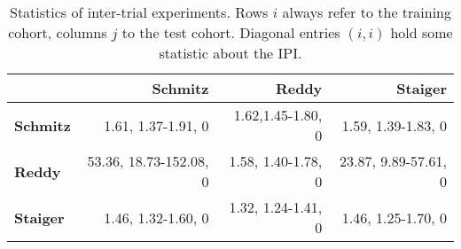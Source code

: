 \begin{table}
    \vspace{0.5cm}
    \begin{subtable}{\textwidth}
        \centering
        \begin{tabular}{lrrr}
            \hline
            & \textbf{Schmitz} & \textbf{Reddy} & \textbf{Staiger} \\
            \hline
            \textbf{Schmitz} & \num{1.61}, \num{1.37}-\num{1.91}, \num{0} & 
                \num{1.62},\num{1.45}-\num{1.80}, \num{0} & 
                \num{1.59}, \num{1.39}-\num{1.83}, 0 \\
            \textbf{Reddy} & \num{53.36}, \num{18.73}-\num{152.08}, 0 & 
                \num{1.58}, \num{1.40}-\num{1.78}, \num{0} & 
                \num{23.87}, \num{9.89}-\num{57.61}, 0 \\
            \textbf{Staiger} & \num{1.46}, \num{1.32}-\num{1.60}, 0 & 
                \num{1.32}, \num{1.24}-\num{1.41}, \num{0} & 
                \num{1.46}, \num{1.25}-\num{1.70}, \num{0} \\
            \hline
        \end{tabular}
        \caption{Hazard ratio, its \num{95}\%-confidence interval and p-value for the null 
            hypothesis of the hazard ratio being equal to one. Diagonal entries show these 
            properties for the $\text{tIPI}$, off-diagonal entries for the best model trained and 
            validated on cohort $i$, $m_i^*$. All p-values are below 
            \num[scientific-notation]{5e-6}.}
            \label{subtab:inter-hr}
    \end{subtable}
    \caption{Statistics of inter-trial experiments. Rows $i$ always refer to the training cohort, 
        columns $j$ to the test cohort. Diagonal entries $(i, i)$ hold some statistic about the 
        IPI.}
    \label{table:inter-trial}
\end{table}